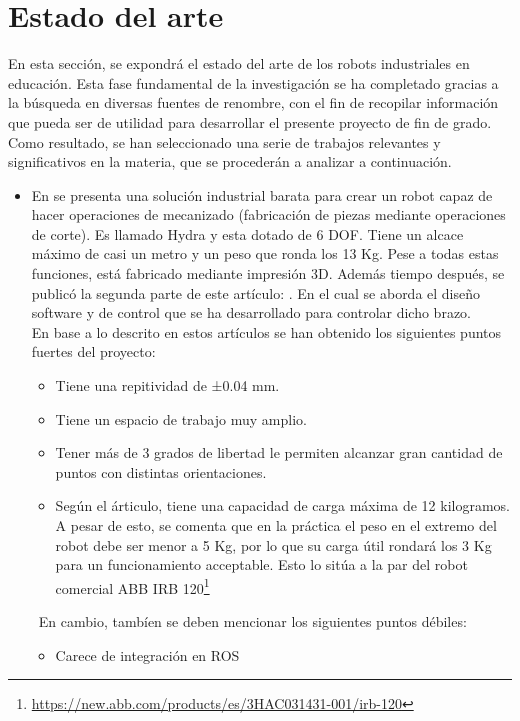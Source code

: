 \chapter{Estado del arte}
\label{cap:capitulo2}
En esta sección, se expondrá el estado del arte de los robots industriales en educación. Esta fase fundamental de la 
investigación se ha completado gracias a la búsqueda en diversas fuentes de renombre, con el fin de 
recopilar información que pueda ser de utilidad para desarrollar el presente proyecto de fin de grado. Como resultado, se 
han seleccionado una serie de trabajos relevantes y significativos en la materia, que se procederán a analizar a continuación.
\begin{itemize}
    \item En \cite{KRIMPENIS2020103} se presenta una solución industrial barata para crear un robot capaz de hacer operaciones de mecanizado (fabricación 
    de piezas mediante operaciones de corte). Es llamado Hydra y esta dotado de 6 \ac{DOF}. Tiene un alcace máximo de casi un metro y un 
    peso que ronda los 13 Kg. Pese a todas estas funciones, está fabricado mediante impresión 3D. 
    Además tiempo después, se publicó la segunda parte de este artículo: \cite{PAPAPASCHOS2020109}. En el cual se aborda el diseño software y de control 
    que se ha desarrollado para controlar dicho brazo. \\
    En base a lo descrito en estos artículos se han obtenido los siguientes puntos fuertes del proyecto:
    \begin{itemize}
        \item Tiene una repitividad de ±0.04 mm.
        \item Tiene un espacio de trabajo muy amplio.
        \item Tener más de 3 grados de libertad le permiten alcanzar gran cantidad de puntos con distintas orientaciones.
        \item Según el árticulo, tiene una capacidad de carga máxima de 12 kilogramos. A pesar de esto, se comenta que en la práctica el peso en el 
        extremo del robot debe ser menor a 5 Kg, por lo que su carga útil rondará los 3 Kg para un funcionamiento acceptable. Esto lo sitúa a la par 
        del robot comercial ABB IRB 120\footnote{\url{https://new.abb.com/products/es/3HAC031431-001/irb-120}}  
    \end{itemize}\
    En cambio, tambíen se deben mencionar los siguientes puntos débiles:
    \begin{itemize}
        \item Carece de integración en ROS

\end{itemize}
\end{itemize}
